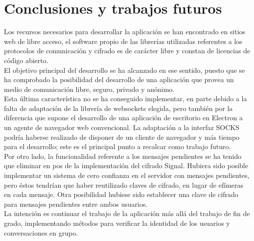 \chapter{Conclusiones y trabajos futuros}

Los recursos necesarios para desarrollar la aplicación se han encontrado en sitios web de libre acceso, el software propio de las librerías utilizadas referentes a los protocolos de comunicación y cifrado es de carácter libre y constan de licencias de código abierto. \\

El objetivo principal del desarrollo se ha alcanzado en ese sentido, puesto que se ha comprobado la posibilidad del desarrollo de una aplicación que provea un medio de comunicación libre, seguro, privado y anónimo. \\ 

Esta última característica no se ha conseguido implementar, en parte debido a la falta de adaptación de la librería de websockets elegida, pero también por la diferencia que supone el desarrollo de una aplicación de escritorio en Electron a un agente de navegador web convencional. La adaptación a la interfaz SOCKS podría haberse realizado de disponer de un cliente de navegador y más tiempo para el desarrollo; este es el principal punto a recalcar como trabajo futuro. \\

Por otro lado, la funcionalidad referente a los mensajes pendientes se ha tenido que eliminar en pos de la implementación del cifrado Signal. Hubiera sido posible implementar un sistema de cero confianza en el servidor con mensajes pendientes, pero éstos tendrían que haber reutilizado claves de cifrado, en lugar de efímeras en cada mensaje. Otra posibilidad hubiese sido establecer una clave de cifrado para mensajes pendientes entre ambos usuarios. \\

La intención es continuar el trabajo de la aplicación más allá del trabajo de fin de grado, implementando métodos para verificar la identidad de los usuarios y conversaciones en grupo. \\